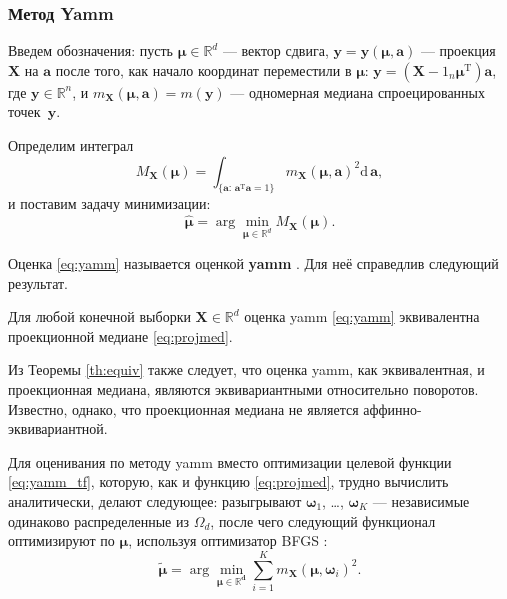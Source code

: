 \subsubsection{Метод Yamm}

Введем обозначения: пусть $\boldsymbol{\mu}  \in \mathbb{R}^d $ --- вектор сдвига,  $\mathbf{y} = \mathbf{y}(\boldsymbol{\mu}, \mathbf{a})$ --- проекция $\mathbf{X}$ на $\mathbf{a}$ после того, как начало координат переместили в $\boldsymbol{\mu}$: $\mathbf{y} = (\mathbf{X} - 1_n \boldsymbol{\mu}^{\mathrm{T}} ) \mathbf{a}$, где $\mathbf{y} \in \mathbb{R}^n$, и $m_{\mathbf{X}}(\boldsymbol{\mu}, \mathbf{a}) = m(\mathbf{y})$ --- одномерная медиана спроецированных точек~$\mathbf{y}$.


Определим интеграл
\begin{equation}\label{eq:yamm_tf}
M_{\mathbf{X}}(\boldsymbol{\mu}) = \int_{\{\mathbf{a}: \, \mathbf{a}^{\mathrm{T}} \mathbf{a} = 1\}} m_{\mathbf{X}}(\boldsymbol{\mu}, \mathbf{a})^2 \textrm{d} \,\mathbf{a},
\end{equation}
и поставим задачу минимизации:
\begin{equation}\label{eq:yamm}
\hat{\boldsymbol{\mu}} = \arg\min_{\boldsymbol{\mu} \in \mathbb{R}^{d}} M_{\mathbf{X}}(\boldsymbol{\mu}).
\end{equation}

Оценка \eqref{eq:yamm} называется оценкой \textbf{yamm} \cite{chen_new_2020}. Для неё справедлив следующий результат.

\newpage

\begin{theorem}\label{th:equiv}
Для любой конечной выборки $\mathbf{X}\in \mathbb{R}^{d}$ оценка yamm \eqref{eq:yamm} эквивалентна проекционной медиане \eqref{eq:projmed}.
\end{theorem}

Из Теоремы \ref{th:equiv} также следует, что оценка yamm, как эквивалентная, и проекционная медиана, являются эквивариантными относительно поворотов. Известно, однако, что проекционная медиана не является аффинно-эквивариантной.
 
Для оценивания по методу yamm вместо оптимизации целевой функции \eqref{eq:yamm_tf}, которую, как и функцию \eqref{eq:projmed}, трудно вычислить аналитически, делают следующее: разыгрывают $\boldsymbol{\omega}_1$, \ldots, $\boldsymbol{\omega}_K$ --- независимые одинаково распределенные из $\Omega_d$, после чего следующий функционал оптимизируют по $\boldsymbol{\mu}$, используя оптимизатор BFGS \cite{nocedal2006numerical}:
\begin{equation*}
\tilde{\boldsymbol{\mu}} = \arg\min_{\boldsymbol{\mu \in \mathbb{R}^{d}}} \sum_{i=1}^K m_{\mathbf{X}}(\boldsymbol{\mu}, \mathbf{\boldsymbol{ \omega}}_i)^2.
\end{equation*}

